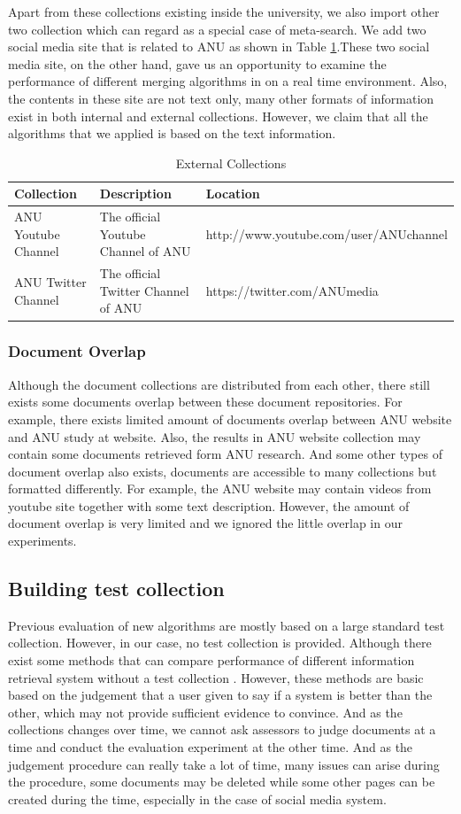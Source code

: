 Apart from these collections existing inside the university, we also import other two collection which can regard as a special case of meta-search. We add two social media site that is related to ANU as shown in Table \ref{table:External collection}.These two social media site, on the other hand, gave us an opportunity to examine the performance of different merging algorithms in on a real time environment. Also, the contents in these site are not text only, many other formats of information exist in both internal and external collections. However, we claim that all the algorithms that we applied is based on the text information.

\begin{table}
\begin{tabular}{|p{3cm}|p{5cm}|p{8cm}|}
\hline 
Collection & Description & Location \\ 
\hline 
ANU Youtube Channel & The official Youtube Channel of ANU & http://www.youtube.com/user/ANUchannel \\ 
\hline 
ANU Twitter Channel  &The official Twitter Channel of ANU & https://twitter.com/ANUmedia\\ 
\hline
\end{tabular} 
\caption{External Collections}
\label{table:External collection}
\end{table}
\subsubsection{Document Overlap}
Although the document collections are distributed from each other, there still exists some documents overlap between these document repositories. For example, there exists limited amount of documents overlap between ANU website and ANU study at website. Also, the results in ANU website collection may contain some documents retrieved form ANU research. And some other types of document overlap also exists, documents are accessible to many collections but formatted differently. For example, the ANU website may contain videos from youtube site together with some text description. However, the amount of document overlap is very limited and we ignored the little overlap in our experiments.

\subsection{Building test collection} 
Previous evaluation of new algorithms are mostly based on a large standard test collection. However, in our case, no test collection is provided. Although there exist some methods that can compare performance of different information retrieval system without a test collection \cite{Thomas2006}. However, these methods are basic based on the judgement that a user given to say if a system is better than the other, which may not provide sufficient evidence to convince. And as the collections changes over time, we cannot ask assessors to judge documents at a time and conduct the evaluation experiment at the other time. And as the judgement procedure can really take a lot of time, many issues can arise during the procedure, some documents may be deleted while some other pages can be created during the time, especially in the case of social media system. 

